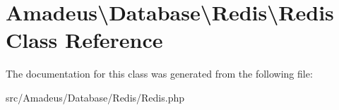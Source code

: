 \hypertarget{classAmadeus_1_1Database_1_1Redis_1_1Redis}{}\section{Amadeus\textbackslash{}Database\textbackslash{}Redis\textbackslash{}Redis Class Reference}
\label{classAmadeus_1_1Database_1_1Redis_1_1Redis}


The documentation for this class was generated from the following file\+:\begin{DoxyCompactItemize}
\item 
src/\+Amadeus/\+Database/\+Redis/Redis.\+php\end{DoxyCompactItemize}
